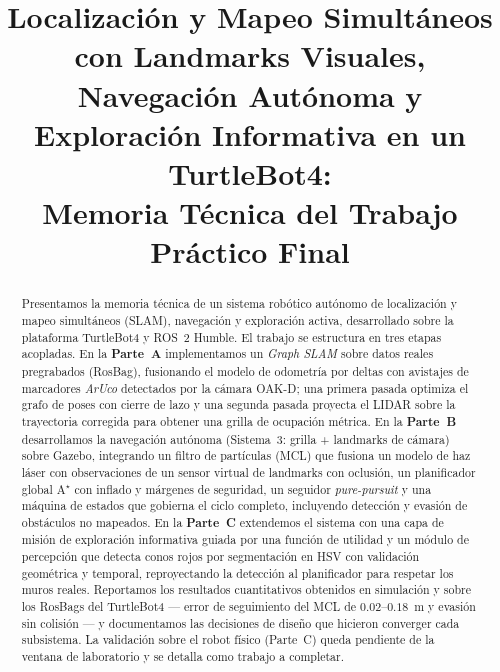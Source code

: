 \documentclass[conference]{IEEEtran}
\begin{document}
\title{Localización y Mapeo Simultáneos con Landmarks Visuales, Navegación Autónoma y Exploración Informativa en un TurtleBot4:\\ Memoria Técnica del Trabajo Práctico Final}

\author{
\and
{}
}

\maketitle

\begin{abstract}
Presentamos la memoria técnica de un sistema robótico autónomo de localización y mapeo simultáneos (SLAM), navegación y exploración activa, desarrollado sobre la plataforma TurtleBot4 y ROS~2 Humble. El trabajo se estructura en tres etapas acopladas. En la \textbf{Parte~A} implementamos un \emph{Graph SLAM} sobre datos reales pregrabados (RosBag), fusionando el modelo de odometría por deltas con avistajes de marcadores \emph{ArUco} detectados por la cámara OAK-D; una primera pasada optimiza el grafo de poses con cierre de lazo y una segunda pasada proyecta el LIDAR sobre la trayectoria corregida para obtener una grilla de ocupación métrica. En la \textbf{Parte~B} desarrollamos la navegación autónoma (Sistema~3: grilla + landmarks de cámara) sobre Gazebo, integrando un filtro de partículas (MCL) que fusiona un modelo de haz láser con observaciones de un sensor virtual de landmarks con oclusión, un planificador global A$^\star$ con inflado y márgenes de seguridad, un seguidor \emph{pure-pursuit} y una máquina de estados que gobierna el ciclo completo, incluyendo detección y evasión de obstáculos no mapeados. En la \textbf{Parte~C} extendemos el sistema con una capa de misión de exploración informativa guiada por una función de utilidad y un módulo de percepción que detecta conos rojos por segmentación en HSV con validación geométrica y temporal, reproyectando la detección al planificador para respetar los muros reales. Reportamos los resultados cuantitativos obtenidos en simulación y sobre los RosBags del TurtleBot4 --- error de seguimiento del MCL de $0.02$--$0.18$~m y evasión sin colisión --- y documentamos las decisiones de diseño que hicieron converger cada subsistema. La validación sobre el robot físico (Parte~C) queda pendiente de la ventana de laboratorio y se detalla como trabajo a completar.
\end{abstract}
\end{document}
